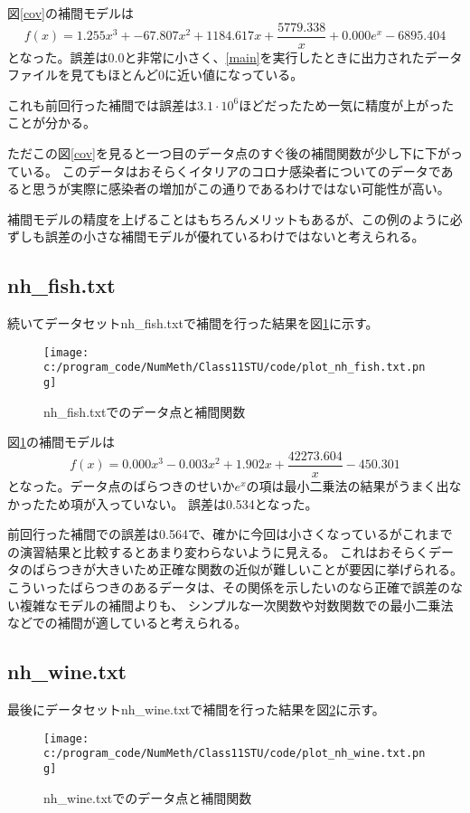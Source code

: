 \documentclass[a4paper,11pt,dvipdfmx]{jsarticle}
\begin{document}
図\ref{cov}の補間モデルは
\[f(x) = 1.255x^3 + -67.807x^2 + 1184.617x + \frac{5779.338}{x} + 0.000e^x - 6895.404\]
となった。誤差は0.0と非常に小さく、\ref{main}を実行したときに出力されたデータファイルを見てもほとんど0に近い値になっている。

これも前回行った補間では誤差は$3.1\cdot 10^6$ほどだったため一気に精度が上がったことが分かる。

ただこの図\ref{cov}を見ると一つ目のデータ点のすぐ後の補間関数が少し下に下がっている。
このデータはおそらくイタリアのコロナ感染者についてのデータであると思うが実際に感染者の増加がこの通りであるわけではない可能性が高い。

補間モデルの精度を上げることはもちろんメリットもあるが、この例のように必ずしも誤差の小さな補間モデルが優れているわけではないと考えられる。

\subsection{nh\_fish.txt}
続いてデータセットnh\_fish.txtで補間を行った結果を図\ref{fish}に示す。
\begin{figure}[h]
\centering
\texttt{[image: c:/program\_code/NumMeth/Class11STU/code/plot\_nh\_fish.txt.png]}
\caption{nh\_fish.txtでのデータ点と補間関数}
\label{fish}
\end{figure}

図\ref{fish}の補間モデルは
\[f(x) = 0.000x^3 - 0.003x^2 + 1.902x + \frac{42273.604}{x} -450.301\]
となった。データ点のばらつきのせいか$e^x$の項は最小二乗法の結果がうまく出なかったため項が入っていない。
誤差は0.534となった。

前回行った補間での誤差は0.564で、確かに今回は小さくなっているがこれまでの演習結果と比較するとあまり変わらないように見える。
これはおそらくデータのばらつきが大きいため正確な関数の近似が難しいことが要因に挙げられる。
こういったばらつきのあるデータは、その関係を示したいのなら正確で誤差のない複雑なモデルの補間よりも、
シンプルな一次関数や対数関数での最小二乗法などでの補間が適していると考えられる。

\subsection{nh\_wine.txt}
最後にデータセットnh\_wine.txtで補間を行った結果を図\ref{wine}に示す。
\begin{figure}[h]
\centering
\texttt{[image: c:/program\_code/NumMeth/Class11STU/code/plot\_nh\_wine.txt.png]}
\caption{nh\_wine.txtでのデータ点と補間関数}
\label{wine}
\end{figure}
\end{document}
